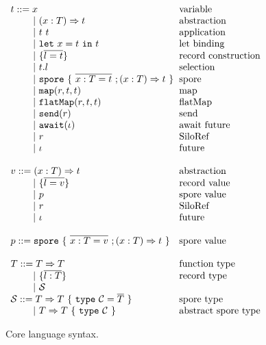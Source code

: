 \documentclass[preprint]{sigplanconf}
\theoremstyle{definition}
\theoremstyle{definition}
\newcommand{\gap}{\quad\quad}
\newcommand{\ba}{\begin{array}}
\newcommand{\ea}{\end{array}}
\newcommand{\seq}[1]{\overline{#1}}
\begin{document}
\begin{figure}[ht!]
  \centering

  $\ba[t]{l@{\hspace{2mm}}l}
t ::=     x                                 & \mbox{variable}
\\
\gap ~|~  (x: T) \Rightarrow t              & \mbox{abstraction}
\\
\gap ~|~  t~t                               & \mbox{application}
\\
\gap ~|~  \texttt{let}~x = t~\texttt{in}~t  & \mbox{let binding}
\\
\gap ~|~  \{ \seq{l = t} \}                 & \mbox{record construction}
\\
\gap ~|~  t.l                               & \mbox{selection}
\\
\gap ~|~  \texttt{spore}~\{~\seq{x : T = t}~; (x: T) \Rightarrow t~\}  & \mbox{spore}
\\
\gap ~|~  \texttt{map}(r, t, t)             & \mbox{map}
\\
\gap ~|~  \texttt{flatMap}(r, t, t)         & \mbox{flatMap}
\\
\gap ~|~  \texttt{send}(r)                  & \mbox{send}
\\
\gap ~|~  \texttt{await}(\iota)             & \mbox{await future}
\\
\gap ~|~  r                                 & \mbox{SiloRef}
\\
\gap ~|~  \iota                             & \mbox{future}
\\
 & \\
v ::=     (x: T) \Rightarrow t              & \mbox{abstraction}
\\
\gap ~|~  \{ \seq{l = v} \}                 & \mbox{record value}
\\
\gap ~|~  p                                 & \mbox{spore value}
\\
\gap ~|~  r                                 & \mbox{SiloRef}
\\
\gap ~|~  \iota                             & \mbox{future}
\\
 & \\
p ::=     \texttt{spore}~\{~\seq{x : T = v}~; (x: T) \Rightarrow t~\}  & \mbox{spore value}
\\
 & \\
T ::=     T \Rightarrow T                   & \mbox{function type} \\
\gap ~|~  \{ \seq{l : T} \}                 & \mbox{record type}   \\
\gap ~|~  \mathcal{S}                       & \mbox{}
\\
\mathcal{S} ::= T \Rightarrow T~\{~\texttt{type}~\mathcal{C} = \seq{T}~\}   & \mbox{spore type}
\\
\gap ~|~  T \Rightarrow T~\{~\texttt{type}~\mathcal{C}~\}   & \mbox{abstract spore type}
\\
\ea$

  \vspace{1mm}
  \caption{Core language syntax.}
  \label{fig:syntax}
  \vspace{1mm}
\end{figure}
\end{document}
